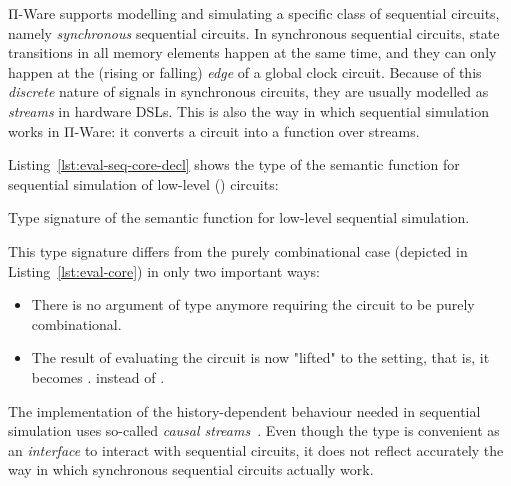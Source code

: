             Π-Ware supports modelling and simulating a specific class of sequential circuits,
            namely \emph{synchronous} sequential circuits.
            In synchronous sequential circuits, state transitions in all memory elements happen
            at the same time, and they can only happen at the (rising or falling) \emph{edge}
            of a global clock circuit.
            Because of this \emph{discrete} nature of signals in synchronous circuits,
            they are usually modelled as \emph{streams} in hardware \acp{DSL}.
            This is also the way in which sequential simulation works in Π-Ware:
            it converts a circuit into a function over streams.

            Listing~\ref{lst:eval-seq-core-decl} shows the type of the semantic function for
            sequential simulation of low-level () circuits:

            \begin{listing}[h]
                \caption{Type signature of the semantic function for low-level sequential simulation.
                    \label{lst:eval-seq-core-decl}}
            \end{listing}

            This type signature differs from the purely combinational case (depicted in Listing~\ref{lst:eval-core})
            in only two important ways:

            \begin{itemize}
                \item There is no argument of type   anymore
                    requiring the circuit to be purely combinational.
                \item The result of evaluating the circuit is now "lifted" to the  setting,
                    that is, it becomes
                     \AY{(} \AY{)}   \AY{(} \AY{)}.
                    instead of     .
            \end{itemize}

            The implementation of the history-dependent behaviour needed in sequential simulation
            uses so-called \emph{causal streams}~\cite{essence-dataflow-programming}.
            Even though the type
             \AY{(} \AY{)}   \AY{(} \AY{)}
            is convenient as an \emph{interface} to interact with sequential circuits, it does not
            reflect accurately the way in which synchronous sequential circuits actually work.

